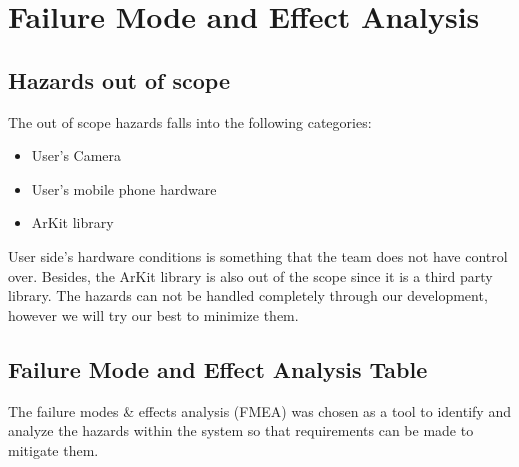 \documentclass{article}
\begin{document}
\section{Failure Mode and Effect Analysis}
\subsection{Hazards out of scope}
The out of scope hazards falls into the following categories:
\begin{itemize}
    \item User's Camera
    \item User's mobile phone hardware
    \item ArKit library
\end{itemize}
User side's hardware conditions is something that the team does not have control over. Besides, the ArKit library is also out of the scope since it is a third party library. The hazards can not be handled completely through our development, however we will try our best to minimize them.
\subsection{Failure Mode and Effect Analysis Table}
The failure modes \& effects analysis (FMEA) was chosen as a tool to identify and analyze the hazards within the system so that requirements can be made to mitigate them.

\end{document}
